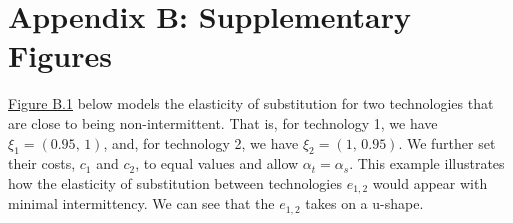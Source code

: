 \documentclass[11pt,a4paper]{extarticle}
\begin{document}
\pagebreak





\section{Appendix B: Supplementary Figures}
\label{sec:AppendixB}


\hyperref[fig:eosrange]{Figure B.1} below models the elasticity of substitution for two technologies that are close to being non-intermittent. That is, for technology 1, we have $\xi_1 = (0.95,\, 1)$, and, for technology 2, we have $\xi_2 = (1, \,0.95)$. We further set their costs, $c_1$ and $c_2$, to equal values and allow $\alpha_t = \alpha_s$. This example illustrates how the elasticity of substitution between technologies $e_{1,2}$ would appear with minimal intermittency. We can see that the $e_{1,2}$ takes on a u-shape. 
\end{document}
